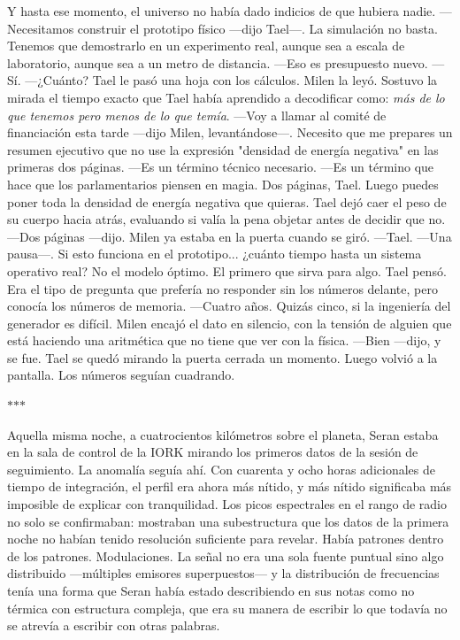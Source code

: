 \documentclass[11pt,a5paper,twoside]{book}
\begin{document}
Y hasta ese momento, el universo no había dado indicios de que hubiera nadie.
—Necesitamos construir el prototipo físico —dijo Tael—. La simulación no basta. Tenemos que demostrarlo en un experimento real, aunque sea a escala de laboratorio, aunque sea a un metro de distancia.
—Eso es presupuesto nuevo.
—Sí.
—¿Cuánto?
Tael le pasó una hoja con los cálculos. Milen la leyó. Sostuvo la mirada el tiempo exacto que Tael había aprendido a decodificar como: \textit{más de lo que tenemos pero menos de lo que temía}.
—Voy a llamar al comité de financiación esta tarde —dijo Milen, levantándose—. Necesito que me prepares un resumen ejecutivo que no use la expresión "densidad de energía negativa" en las primeras dos páginas.
—Es un término técnico necesario.
—Es un término que hace que los parlamentarios piensen en magia. Dos páginas, Tael. Luego puedes poner toda la densidad de energía negativa que quieras.
Tael dejó caer el peso de su cuerpo hacia atrás, evaluando si valía la pena objetar antes de decidir que no.
—Dos páginas —dijo.
Milen ya estaba en la puerta cuando se giró.
—Tael. —Una pausa—. Si esto funciona en el prototipo... ¿cuánto tiempo hasta un sistema operativo real? No el modelo óptimo. El primero que sirva para algo.
Tael pensó. Era el tipo de pregunta que prefería no responder sin los números delante, pero conocía los números de memoria.
—Cuatro años. Quizás cinco, si la ingeniería del generador es difícil.
Milen encajó el dato en silencio, con la tensión de alguien que está haciendo una aritmética que no tiene que ver con la física.
—Bien —dijo, y se fue.
Tael se quedó mirando la puerta cerrada un momento. Luego volvió a la pantalla.
Los números seguían cuadrando.
\vspace{1.5em}
\begin{center}$\ast$\quad$\ast$\quad$\ast$\end{center}
\vspace{1.5em}
Aquella misma noche, a cuatrocientos kilómetros sobre el planeta, Seran estaba en la sala de control de la IORK mirando los primeros datos de la sesión de seguimiento.
La anomalía seguía ahí.
Con cuarenta y ocho horas adicionales de tiempo de integración, el perfil era ahora más nítido, y más nítido significaba más imposible de explicar con tranquilidad. Los picos espectrales en el rango de radio no solo se confirmaban: mostraban una subestructura que los datos de la primera noche no habían tenido resolución suficiente para revelar. Había patrones dentro de los patrones. Modulaciones. La señal no era una sola fuente puntual sino algo distribuido —múltiples emisores superpuestos— y la distribución de frecuencias tenía una forma que Seran había estado describiendo en sus notas como no térmica con estructura compleja, que era su manera de escribir lo que todavía no se atrevía a escribir con otras palabras.
\end{document}

